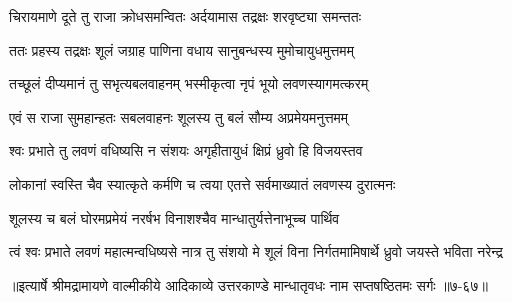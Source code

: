 \twolineshloka
{चिरायमाणे दूते तु राजा क्रोधसमन्वितः}
{अर्दयामास तद्रक्षः शरवृष्ट्या समन्ततः} %

\twolineshloka
{ततः प्रहस्य तद्रक्षः शूलं जग्राह पाणिना}
{वधाय सानुबन्धस्य मुमोचायुधमुत्तमम्} %

\twolineshloka
{तच्छूलं दीप्यमानं तु सभृत्यबलवाहनम्}
{भस्मीकृत्वा नृपं भूयो लवणस्यागमत्करम्} %

\twolineshloka
{एवं स राजा सुमहान्हतः सबलवाहनः}
{शूलस्य तु बलं सौम्य अप्रमेयमनुत्तमम्} %

\twolineshloka
{श्वः प्रभाते तु लवणं वधिष्यसि न संशयः}
{अगृहीतायुधं क्षिप्रं ध्रुवो हि विजयस्तव} %

\twolineshloka
{लोकानां स्वस्ति चैव स्यात्कृते कर्मणि च त्वया}
{एतत्ते सर्वमाख्यातं लवणस्य दुरात्मनः} %

\twolineshloka
{शूलस्य च बलं घोरमप्रमेयं नरर्षभ}
{विनाशश्चैव मान्धातुर्यत्तेनाभूच्च पार्थिव} %

\twolineshloka
{त्वं श्वः प्रभाते लवणं महात्मन्वधिष्यसे नात्र तु संशयो मे}
{शूलं विना निर्गतमामिषार्थे ध्रुवो जयस्ते भविता नरेन्द्र} %


॥इत्यार्षे श्रीमद्रामायणे वाल्मीकीये आदिकाव्ये उत्तरकाण्डे मान्धातृवधः नाम सप्तषष्ठितमः सर्गः ॥७-६७॥
